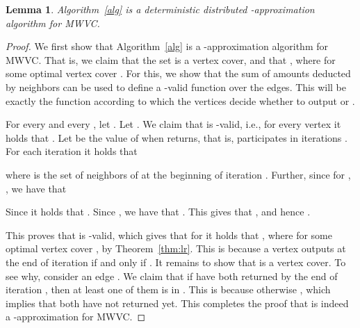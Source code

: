 \documentclass[11pt]{article}
\newtheorem{lemma}[theorem]{Lemma}
\begin{document}
\begin{lemma}
\label{lemma:approx}
Algorithm~\ref{alg} is a deterministic distributed -approximation algorithm for MWVC.
\end{lemma}
\begin{proof}
We first show that Algorithm~\ref{alg} is a -approximation algorithm for MWVC. That is, we claim that the set  is a vertex cover, and that , where  for some optimal vertex cover . For this, we show that the sum of amounts deducted by neighbors can be used to define a -valid function over the edges. This will be exactly the function according to which the vertices decide whether to output  or .

For every  and every , let . Let . We claim that  is -valid, i.e., for every vertex  it holds that . Let  be the value of  when  returns, that is,  participates in iterations . For each iteration  it holds that

where  is the set of neighbors of  at the beginning of iteration .
Further, since for , , we have that


Since  it holds that . Since , we have that .
This gives that , and hence .

This proves that  is -valid, which gives that for   it holds that , where  for some optimal vertex cover , by Theorem~\ref{thm:lr}. This is because a vertex  outputs  at the end of iteration  if and only if . It remains to show that  is a vertex cover. To see why, consider an edge . We claim that if  have both returned by the end of iteration , then at least one of them is in . This is because otherwise , which implies that both have not returned yet. This completes the proof that  is indeed a -approximation for MWVC.
\end{proof}
\end{document}
